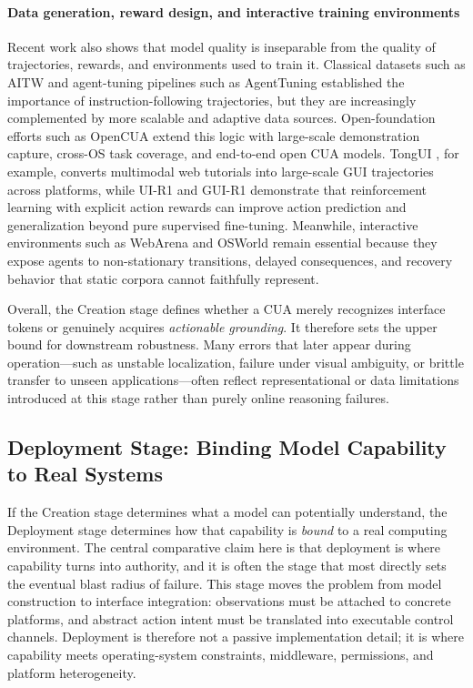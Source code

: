 \paragraph{Data generation, reward design, and interactive training environments}
Recent work also shows that model quality is inseparable from the quality of trajectories, rewards, and environments used to train it. Classical datasets such as AITW \cite{rawles2023androidinthewild} and agent-tuning pipelines such as AgentTuning \cite{zeng2024agenttuning} established the importance of instruction-following trajectories, but they are increasingly complemented by more scalable and adaptive data sources. Open-foundation efforts such as OpenCUA \cite{wang2025opencua} extend this logic with large-scale demonstration capture, cross-OS task coverage, and end-to-end open CUA models. TongUI \cite{zhang2025tongui}, for example, converts multimodal web tutorials into large-scale GUI trajectories across platforms, while UI-R1 \cite{lu2025ui} and GUI-R1 \cite{luo2025gui} demonstrate that reinforcement learning with explicit action rewards can improve action prediction and generalization beyond pure supervised fine-tuning. Meanwhile, interactive environments such as WebArena \cite{zhou2023webarena} and OSWorld \cite{xie2024osworld} remain essential because they expose agents to non-stationary transitions, delayed consequences, and recovery behavior that static corpora cannot faithfully represent.

Overall, the Creation stage defines whether a CUA merely recognizes interface tokens or genuinely acquires \emph{actionable grounding}. It therefore sets the upper bound for downstream robustness. Many errors that later appear during operation---such as unstable localization, failure under visual ambiguity, or brittle transfer to unseen applications---often reflect representational or data limitations introduced at this stage rather than purely online reasoning failures.

\subsection{Deployment Stage: Binding Model Capability to Real Systems}
\label{sec:deployment}

If the Creation stage determines what a model can potentially understand, the Deployment stage determines how that capability is \emph{bound} to a real computing environment. The central comparative claim here is that deployment is where capability turns into authority, and it is often the stage that most directly sets the eventual blast radius of failure. This stage moves the problem from model construction to interface integration: observations must be attached to concrete platforms, and abstract action intent must be translated into executable control channels. Deployment is therefore not a passive implementation detail; it is where capability meets operating-system constraints, middleware, permissions, and platform heterogeneity.

